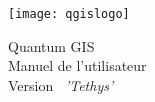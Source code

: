 
\begin{titlepage}
\begin{center}

\begin{center}
\texttt{[image: qgislogo]} 
\end{center}

\Huge{Quantum GIS}\\
\vspace{0.5cm}
\Large{Manuel de l'utilisateur} \\
\vspace{0.5cm}
\Large{Version ~\CURRENT \textsl{'Tethys'}}

\end{center}
\end{titlepage}
